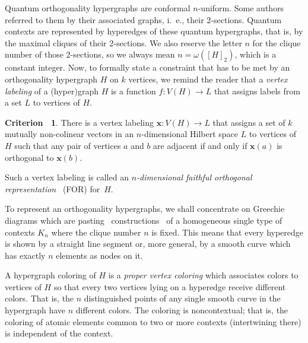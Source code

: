 \documentclass[%
12pt,
prereprint,
showpacs,
showkeys,
preprintnumbers,
amsmath,amssymb,
aps,
pra,
longbibliography,
notitlepage
]{revtex4-1}
\theoremstyle{definition}
\newtheorem{criterion}[theorem]{{\color{THM}Criterion\ }}
\begin{document}
        Quantum orthogonality hypergraphs are conformal $n$-uniform. Some authors referred to them by their associated graphs, i.~e., their 2-sections. Quantum contexts are represented by hyperedges of these quantum hypergraphs, that is, by the maximal cliques of their 2-sections. We also reserve the letter $n$ for the clique number of those 2-sections, so we always mean $n=\omega ([H]_2 )$, which is a constant integer. Now, to formally state a constraint that has to be met by an orthogonality hypergraph $H$ on $k$ vertices, we remind the reader that a \emph{vertex labeling} of a (hyper)graph $H$ is a function $f:V(H)\longrightarrow L$ that assigns labels from a set $L$ to vertices of $H$.

        \begin{criterion}\label{orthogonality}
                There is a vertex labeling $\bm{x}:V(H)\longrightarrow L$ that assigns a set of $k$ mutually non-colinear vectors in an $n$-dimensional Hilbert space $L$ to vertices of $H$ such that any pair of vertices $a$ and $b$ are adjacent if and only if $\bm{x}(a)$ is orthogonal to $\bm{x}(b)$.
        \end{criterion}

        Such a vertex labeling is called an \emph{$n$-dimensional faithful orthogonal representation}~\cite{lovasz-79,lovasz-89,Portillo-2015} (FOR) for~$H$.

        To represent an orthogonality hypergraphs, we shall concentrate on Greechie diagrams which are pasting~\cite{Greechie1968} constructions~\cite[Chapter~2]{greechie-66-PhD}
        of a homogeneous  single type
        of contexts $K_n$
        where the clique number $n$ is fixed. This means that every hyperedge is shown by a straight line segment or, more general, by a smooth curve which has exactly $n$ elements as nodes on it.

        A hypergraph coloring of $H$ is a \emph{proper vertex coloring} which associates colors to vertices of $H$ so that every two vertices lying on a hyperedge receive different colors. That is, the $n$ distinguished points of any single smooth curve in the hypergraph have $n$ different colors.
        The coloring is noncontextual; that is, the coloring of atomic elements common to two or more contexts (intertwining there)
        is independent of the context.
\end{document}
